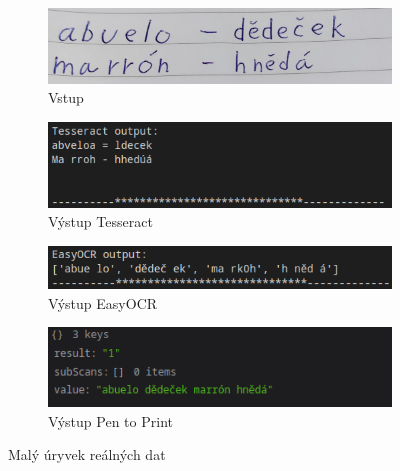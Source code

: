 \documentclass[journal]{IEEEtran}
\begin{document}
\begin{figure}

\begin{subfigure}{\linewidth}
        \centering
        \includegraphics[width=\linewidth]{Images/pageSnippet.jpg}
        \caption{Vstup}
        \label{fig:pageSnippet}
\end{subfigure}

\begin{subfigure}{\linewidth}
        \centering
        \includegraphics[width=\linewidth]{Images/Tesseract_PageSnippet.png}
        \caption{Výstup Tesseract}
        \label{fig:Tesseract_PageSnippet}
\end{subfigure}

\begin{subfigure}{\linewidth}
        \centering
        \includegraphics[width=\linewidth]{Images/easyOCR_PageSnippet.png}
        \caption{Výstup EasyOCR}
        \label{fig:easyOCR_PageSnippet}
\end{subfigure}

\begin{subfigure}{\linewidth}
        \centering
        \includegraphics[width=\linewidth]{Images/penToPrint_PageSnippet.png}
        \caption{Výstup Pen to Print}
        \label{fig:penToPrint_PageSnippet}
\end{subfigure}
\caption{Malý úryvek reálných dat}

\end{figure}
\end{document}
